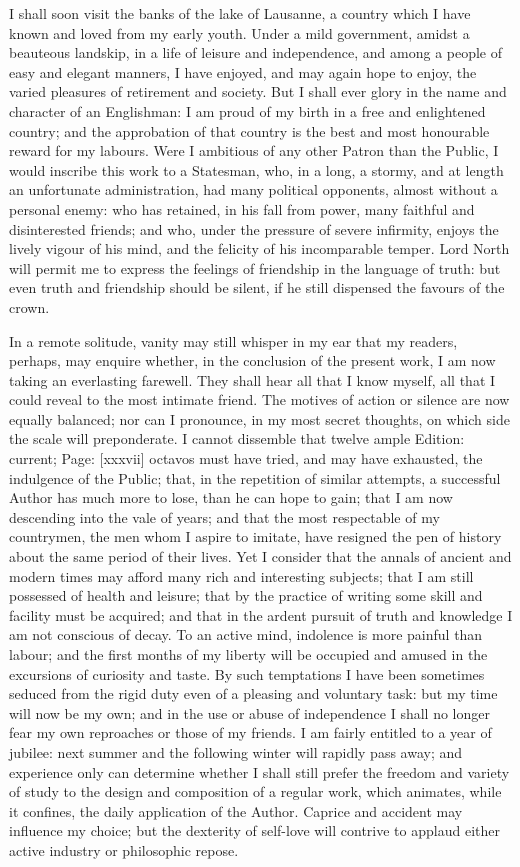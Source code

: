 I shall soon visit the banks of the lake of Lausanne, a country which I have known and loved from my early youth. Under a mild government, amidst a beauteous landskip, in a life of leisure and independence, and among a people of easy and elegant manners, I have enjoyed, and may again hope to enjoy, the varied pleasures of retirement and society. But I shall ever glory in the name and character of an Englishman: I am proud of my birth in a free and enlightened country; and the approbation of that country is the best and most honourable reward for my labours. Were I ambitious of any other Patron than the Public, I would inscribe this work to a Statesman, who, in a long, a stormy, and at length an unfortunate administration, had many political opponents, almost without a personal enemy: who has retained, in his fall from power, many faithful and disinterested friends; and who, under the pressure of severe infirmity, enjoys the lively vigour of his mind, and the felicity of his incomparable temper. Lord North will permit me to express the feelings of friendship in the language of truth: but even truth and friendship should be silent, if he still dispensed the favours of the crown.

In a remote solitude, vanity may still whisper in my ear that my readers, perhaps, may enquire whether, in the conclusion of the present work, I am now taking an everlasting farewell. They shall hear all that I know myself, all that I could reveal to the most intimate friend. The motives of action or silence are now equally balanced; nor can I pronounce, in my most secret thoughts, on which side the scale will preponderate. I cannot dissemble that twelve ample Edition: current; Page: [xxxvii] octavos must have tried, and may have exhausted, the indulgence of the Public; that, in the repetition of similar attempts, a successful Author has much more to lose, than he can hope to gain; that I am now descending into the vale of years; and that the most respectable of my countrymen, the men whom I aspire to imitate, have resigned the pen of history about the same period of their lives. Yet I consider that the annals of ancient and modern times may afford many rich and interesting subjects; that I am still possessed of health and leisure; that by the practice of writing some skill and facility must be acquired; and that in the ardent pursuit of truth and knowledge I am not conscious of decay. To an active mind, indolence is more painful than labour; and the first months of my liberty will be occupied and amused in the excursions of curiosity and taste. By such temptations I have been sometimes seduced from the rigid duty even of a pleasing and voluntary task: but my time will now be my own; and in the use or abuse of independence I shall no longer fear my own reproaches or those of my friends. I am fairly entitled to a year of jubilee: next summer and the following winter will rapidly pass away; and experience only can determine whether I shall still prefer the freedom and variety of study to the design and composition of a regular work, which animates, while it confines, the daily application of the Author. Caprice and accident may influence my choice; but the dexterity of self-love will contrive to applaud either active industry or philosophic repose.

